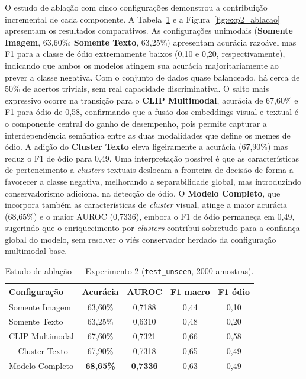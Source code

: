 O estudo de ablação com cinco configurações demonstrou a contribuição incremental de cada componente. A Tabela~\ref{tab:ablacao_exp2} e a Figura~\ref{fig:exp2_ablacao} apresentam os resultados comparativos. As configurações unimodais (\textbf{Somente Imagem}, 63,60\%; \textbf{Somente Texto}, 63,25\%) apresentam acurácia razoável mas F1 para a classe de ódio extremamente baixos (0,10 e 0,20, respectivamente), indicando que ambos os modelos atingem sua acurácia majoritariamente ao prever a classe negativa. Com o conjunto de dados quase balanceado, há cerca de 50\% de acertos triviais, sem real capacidade discriminativa. O salto mais expressivo ocorre na transição para o \textbf{CLIP Multimodal}, acurácia de 67,60\% e F1 para ódio de 0,58, confirmando que a fusão dos embeddings visual e textual é o componente central do ganho de desempenho, pois permite capturar a interdependência semântica entre as duas modalidades que define os memes de ódio. A adição do \textbf{Cluster Texto} eleva ligeiramente a acurácia (67,90\%) mas reduz o F1 de ódio para 0,49. Uma interpretação possível é que as características de pertencimento a \textit{clusters} textuais deslocam a fronteira de decisão de forma a favorecer a classe negativa, melhorando a separabilidade global, mas introduzindo conservadorismo adicional na detecção de ódio. O \textbf{Modelo Completo}, que incorpora também as características de \textit{cluster} visual, atinge a maior acurácia (68,65\%) e o maior AUROC (0,7336), embora o F1 de ódio permaneça em 0,49, sugerindo que o enriquecimento por \textit{clusters} contribui sobretudo para a confiança global do modelo, sem resolver o viés conservador herdado da configuração multimodal base.

\begin{table}[htbp]
\centering
\caption{Estudo de ablação — Experimento 2 (\texttt{test\_unseen}, 2000 amostras).}
\label{tab:ablacao_exp2}
\begin{tabular}{lcccc}
\hline
\textbf{Configuração} & \textbf{Acurácia} & \textbf{AUROC} & \textbf{F1 macro} & \textbf{F1 ódio} \\
\hline
Somente Imagem    & 63,60\% & 0,7188 & 0,44 & 0,10 \\
Somente Texto     & 63,25\% & 0,6310 & 0,48 & 0,20 \\
CLIP Multimodal   & 67,60\% & 0,7321 & 0,66 & 0,58 \\
+ Cluster Texto   & 67,90\% & 0,7318 & 0,65 & 0,49 \\
Modelo Completo   & \textbf{68,65\%} & \textbf{0,7336} & 0,63 & 0,49 \\
\hline
\end{tabular}
\end{table}

